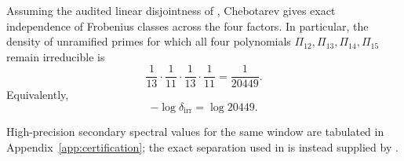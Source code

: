 \begin{remark}
\label{rem:product-density-window}
Assuming the audited linear disjointness of
, Chebotarev gives exact independence of
Frobenius classes across the four factors.  In particular, the density of
unramified primes for which all four polynomials
\(\Pi_{12},\Pi_{13},\Pi_{14},\Pi_{15}\) remain irreducible is
\[
  \frac{1}{13}\cdot\frac{1}{11}\cdot\frac{1}{13}\cdot\frac{1}{11}
  =\frac{1}{20449}.
\]
Equivalently,
\[
  -\log \delta_{\mathrm{irr}}=\log 20449.
\]
\end{remark}

High-precision secondary spectral values for the same window are tabulated in
Appendix~\ref{app:certification}; the exact separation used in
 is instead supplied by
.
